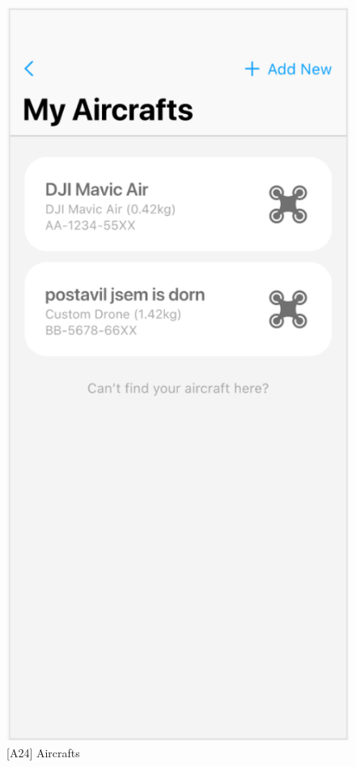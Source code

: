 \begin{figure}
    \centering
    \begin{minipage}{.45\textwidth}
        \centering
        \includegraphics[width=.7\linewidth]{assets/user_interface_design/aircraft/aircrafts.png}
        \caption{[A24] Aircrafts}
        \label{fig:aircrafts}
    \end{minipage}%
    \hspace{.05\linewidth}
    \begin{minipage}{.45\textwidth}
        \centering

\end{minipage}
\end{figure}
